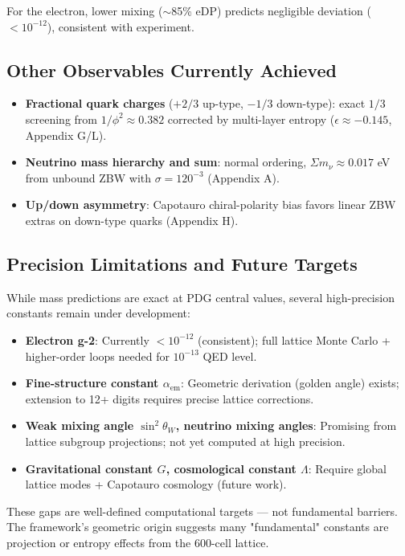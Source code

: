 \documentclass{article}
\begin{document}
For the electron, lower mixing ($\sim$85\% eDP) predicts negligible deviation ($< 10^{-12}$), consistent with experiment.

\subsection{Other Observables Currently Achieved}
\begin{itemize}
    \item \textbf{Fractional quark charges} (\(+2/3\) up-type, \(-1/3\) down-type): exact \(1/3\) screening from \(1/\phi^2 \approx 0.382\) corrected by multi-layer entropy (\(\epsilon \approx -0.145\), Appendix G/L).
    \item \textbf{Neutrino mass hierarchy and sum}: normal ordering, \(\Sigma m_\nu \approx 0.017\) eV from unbound ZBW with \(\sigma = 120^{-3}\) (Appendix A).
    \item \textbf{Up/down asymmetry}: Capotauro chiral-polarity bias favors linear ZBW extras on down-type quarks (Appendix H).
\end{itemize}

\subsection{Precision Limitations and Future Targets}
While mass predictions are exact at PDG central values, several high-precision constants remain under development:
\begin{itemize}
    \item \textbf{Electron g-2}: Currently \(< 10^{-12}\) (consistent); full lattice Monte Carlo + higher-order loops needed for \(10^{-13}\) QED level.
    \item \textbf{Fine-structure constant \(\alpha_\text{em}\)}: Geometric derivation (golden angle) exists; extension to 12+ digits requires precise lattice corrections.
    \item \textbf{Weak mixing angle \(\sin^2\theta_W\), neutrino mixing angles}: Promising from lattice subgroup projections; not yet computed at high precision.
    \item \textbf{Gravitational constant \(G\), cosmological constant \(\Lambda\)}: Require global lattice modes + Capotauro cosmology (future work).
\end{itemize}

These gaps are well-defined computational targets — not fundamental barriers. The framework's geometric origin suggests many "fundamental" constants are projection or entropy effects from the 600-cell lattice.
\end{document}
